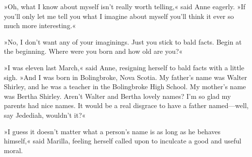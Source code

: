 »Oh, what I know about myself isn’t really worth telling,« said Anne eagerly. »If you’ll only let me tell you what I imagine about myself you’ll think it ever so much more interesting.«

»No, I don’t want any of your imaginings. Just you stick to bald facts. Begin at the beginning. Where were you born and how old are you?«

»I was eleven last March,« said Anne, resigning herself to bald facts with a little sigh. »And I was born in Bolingbroke, Nova Scotia. My father’s name was Walter Shirley, and he was a teacher in the Bolingbroke High School. My mother’s name was Bertha Shirley. Aren’t Walter and Bertha lovely names? I’m so glad my parents had nice names. It would be a real disgrace to have a father named—well, say Jedediah, wouldn’t it?«

»I guess it doesn’t matter what a person’s name is as long as he behaves himself,« said Marilla, feeling herself called upon to inculcate a good and useful moral.

